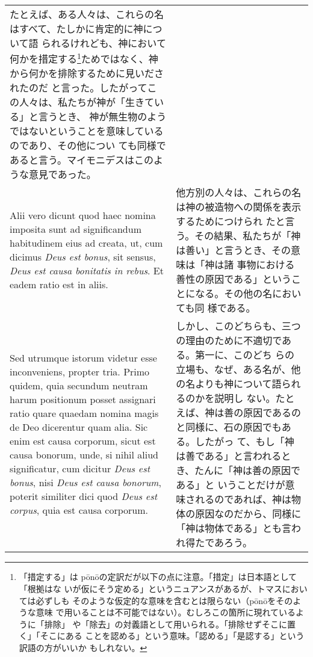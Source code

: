 \documentclass[10pt]{jsarticle}
\begin{document}
\begin{longtable}{p{21em}p{21em}}
たとえば、ある人々は、これらの名はすべて、たしかに肯定的に神について語
られるけれども、神において何かを措定する\footnote{「措定する」は
p\={o}n\={o}の定訳だが以下の点に注意。「措定」は日本語として「根拠はな
いが仮にそう定める」というニュアンスがあるが、トマスにおいては必ずしも
そのような仮定的な意味を含むとは限らない（p\={o}n\={o}をそのような意味
で用いることは不可能ではない）。むしろこの箇所に現れているように「排除」
や「除去」の対義語として用いられる。「排除せずそこに置く」「そこにある
ことを認める」という意味。「認める」「是認する」という訳語の方がいいか
もしれない。}ためではなく、神から何かを排除するために見いだされたのだ
と言った。したがってこの人々は、私たちが神が「生きている」と言うとき、
神が無生物のようではないということを意味しているのであり、その他につい
ても同様であると言う。マイモニデスはこのような意見であった。

\\

Alii vero dicunt quod haec nomina imposita sunt ad significandum
habitudinem eius ad creata, ut, cum dicimus {\it Deus est bonus}, sit
sensus, {\it Deus est causa bonitatis in rebus}. Et eadem ratio est in
aliis.

&

他方別の人々は、これらの名は神の被造物への関係を表示するためにつけられ
たと言う。その結果、私たちが「神は善い」と言うとき、その意味は「神は諸
事物における善性の原因である」ということになる。その他の名においても同
様である。

\\

Sed utrumque istorum videtur esse inconveniens, propter tria. Primo
quidem, quia secundum neutram harum positionum posset assignari ratio
quare quaedam nomina magis de Deo dicerentur quam alia. Sic enim est
causa corporum, sicut est causa bonorum, unde, si nihil aliud
significatur, cum dicitur {\it Deus est bonus}, nisi {\it Deus est
causa bonorum}, poterit similiter dici quod {\it Deus est corpus},
quia est causa corporum.

&

しかし、このどちらも、三つの理由のために不適切である。第一に、このどち
らの立場も、なぜ、ある名が、他の名よりも神について語られるのかを説明し
ない。たとえば、神は善の原因であるのと同様に、石の原因でもある。したがっ
て、もし「神は善である」と言われるとき、たんに「神は善の原因である」と
いうことだけが意味されるのであれば、神は物体の原因なのだから、同様に
「神は物体である」とも言われ得たであろう。

\\


\end{longtable}
\end{document}
